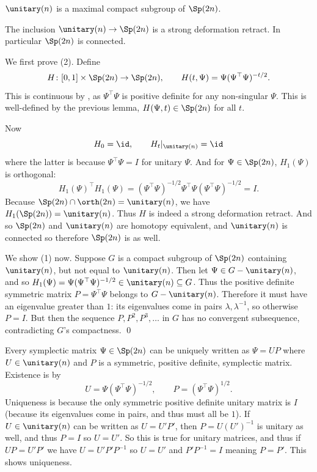 \eproof

\bprop

    \benum
        \item $\unitary(n)$ is a maximal compact subgroup of $\Sp(2n)$.
        \item The inclusion $\unitary(n)\to\Sp(2n)$ is a strong deformation retract.
        In particular $\Sp(2n)$ is connected.
    \eenum

\eprop

\bproof

    We first prove (2).
    Define
    $$ H\colon[0,1]\times\Sp(2n)\to\Sp(2n),\qquad H(t,\Psi) = \Psi(\Psi^\top\Psi)^{-t/2} . $$
    This is continuous by , as $\Psi^\top\Psi$ is positive definite for any non-singular $\Psi$.
    This is well-defined by the previous lemma, $H(\Psi,t)\in\Sp(2n)$ for all $t$.

    Now
    $$ H_0 = \id,\qquad H_t|_{\unitary(n)} = \id $$
    where the latter is because $\Psi^\top\Psi=I$ for unitary $\Psi$.
    And for $\Psi\in\Sp(2n)$, $H_1(\Psi)$ is orthogonal:
    $$ H_1(\Psi)^\top H_1(\Psi) = (\Psi^\top\Psi)^{-1/2}\Psi^\top\Psi(\Psi^\top\Psi)^{-1/2} = I . $$
    Because $\Sp(2n)\cap\orth(2n)=\unitary(n)$, we have $H_1(\Sp(2n))=\unitary(n)$.
    Thus $H$ is indeed a strong deformation retract.
    And so $\Sp(2n)$ and $\unitary(n)$ are homotopy equivalent, and $\unitary(n)$ is connected so therefore $\Sp(2n)$ is as well.

    We show (1) now.
    Suppose $G$ is a compact subgroup of $\Sp(2n)$ containing $\unitary(n)$, but not equal to $\unitary(n)$.
    Then let $\Psi\in G-\unitary(n)$, and so $H_1(\Psi)=\Psi(\Psi^\top\Psi)^{-1/2}\in\unitary(n)\subseteq G$.
    Thus the positive definite symmetric matrix $P=\Psi^\top\Psi$ belongs to $G-\unitary(n)$.
    Therefore it must have an eigenvalue greater than $1$: its eigenvalues come in pairs $\lambda,\lambda^{-1}$, so otherwise $P=I$.
    But then the sequence $P,P^2,P^3,\dots$ in $G$ has no convergent subsequence, contradicting $G$'s compactness.
    \qed

\eproof

\bremark

    Every symplectic matrix $\Psi\in\Sp(2n)$ can be uniquely written as $\Psi=UP$ where $U\in\unitary(n)$ and $P$ is a symmetric, positive definite, symplectic matrix.
    Existence is by
    $$ U = \Psi(\Psi^\top\Psi)^{-1/2},\qquad P = (\Psi^\top\Psi)^{1/2} . $$
    Uniqueness is because the only symmetric positive definite unitary matrix is $I$ (because its eigenvalues come in pairs, and thus must all be $1$).
    If $U\in\unitary(n)$ can be written as $U=U'P'$, then $P=U(U')^{-1}$ is unitary as well, and thus $P=I$ so $U=U'$.
    So this is true for unitary matrices, and thus if $UP=U'P'$ we have $U=U'P'P^{-1}$ so $U=U'$ and $P'P^{-1}=I$ meaning $P=P'$.
    This shows uniqueness.

